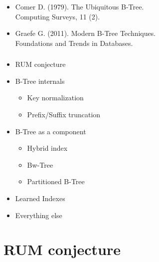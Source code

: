 \documentclass[usenames,dvipsnames, 18pt, compress, aspectratio=169]{beamer}
\begin{document}
\begin{frame}[fragile]{}
    \frametitle{}

    \begin{itemize}[label={\MVRightarrow}]
        \item <+-> Comer D. (1979). The Ubiquitous B-Tree. \\
            Computing Surveys, 11 (2).
        \item <+-> Graefe G. (2011). Modern B-Tree Techniques. \\
            Foundations and Trends in Databases.
    \end{itemize}
\end{frame}

\begin{frame}[fragile]{}
    \frametitle{}

    \begin{itemize}[label={\MVRightarrow}]
        \item RUM conjecture
        \item B-Tree internals
        \begin{itemize}[label={}]
            \item \footnotesize{Key normalization}
            \item \footnotesize{Prefix/Suffix truncation}
        \end{itemize}
        \item B-Tree as a component
        \begin{itemize}[label={}]
            \item \footnotesize{Hybrid index}
            \item \footnotesize{Bw-Tree}
            \item \footnotesize{Partitioned B-Tree}
        \end{itemize}
        \item Learned Indexes
        \item Everything else
    \end{itemize}
\end{frame}

\section{RUM conjecture}
\end{document}
